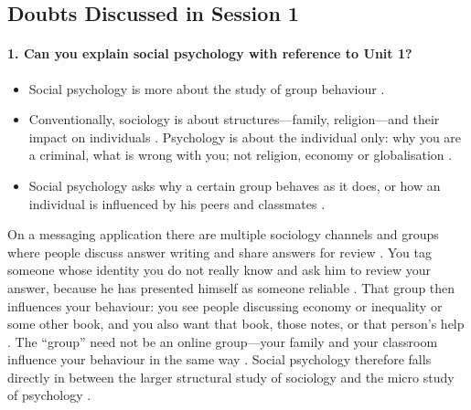 \subsection{Doubts Discussed in Session 1}

\paragraph{1. Can you explain social psychology with reference to Unit 1?}
\begin{itemize}
    \item Social psychology is more about the study of group behaviour .
    \item Conventionally, sociology is about structures---family, religion---and their impact on individuals . Psychology is about the individual only: why you are a criminal, what is wrong with you; not religion, economy or globalisation .
    \item Social psychology asks why a certain group behaves as it does, or how an individual is influenced by his peers and classmates .
\end{itemize}

\begin{ExampleBox}
On a messaging application there are multiple sociology channels and groups where people discuss answer writing and share answers for review . You tag someone whose identity you do not really know and ask him to review your answer, because he has presented himself as someone reliable . That group then influences your behaviour: you see people discussing economy or inequality or some other book, and you also want that book, those notes, or that person's help . The ``group'' need not be an online group---your family and your classroom influence your behaviour in the same way . Social psychology therefore falls directly in between the larger structural study of sociology and the micro study of psychology .
\end{ExampleBox}

